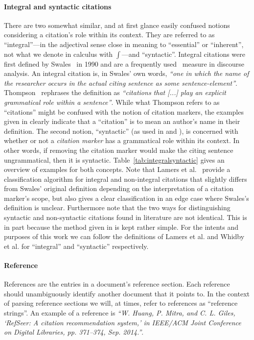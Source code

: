 \paragraph{Integral and syntactic citations} There are two somewhat similar, and at first glance easily confused notions considering a citation's role within its context. They are referred to as ``integral''---in the adjectival sense close in meaning to ``essential'' or ``inherent'', not what we denote in calculus with $\int$---and ``syntactic''. Integral citations were first defined by Swales~\cite{Swales1990} in 1990 and are a frequently used~\cite{Hyland1999,Thompson2001,Okamura2008,Lamers2018} measure in discourse analysis. An integral citation is, in Swales' own words, \emph{``one in which the name of the researcher occurs in the actual citing sentence as some sentence-element''}. Thompson~\cite{Thompson2001} rephrases the definition as \emph{``citations that [...] play an explicit grammatical role within a sentence''}. While what Thompson refers to as ``citations'' might be confused with the notion of citation markers, the examples given in \cite{Thompson2001} clearly indicate that a ``citation'' is to mean an author's name in their definition. The second notion, ``syntactic'' (as used in \cite{Whidby2011} and \cite{Abujbara2012}), is concerned with whether or not a \emph{citation marker} has a grammatical role within its context. In other words, if removing the citation marker would make the citing sentence ungrammatical, then it is syntactic. Table~\ref{tab:integralsyntactic} gives an overview of examples for both concepts. Note that Lamers et al.~\cite{Lamers2018} provide a classification algorithm for integral and non-integral citations that slightly differs from Swales' original definition depending on the interpretation of a citation marker's scope, but also gives a clear classification in an edge case where Swales's definition is unclear. Furthermore note that the two ways for distinguishing syntactic and non-syntactic citations found in literature are not identical. This is in part because the method given in \cite{Abujbara2012} is kept rather simple. For the intents and purposes of this work we can follow the definitions of Lamers et al. and Whidby et al. for ``integral'' and ``syntactic'' respectively.
\paragraph{Reference} References are the entries in a document's reference section. Each reference should unambiguously identify another document that it points to. In the context of parsing reference sections we will, at times, refer to references as ``reference strings''. An example of a reference is \emph{``W. Huang, P. Mitra, and C. L. Giles, `RefSeer: A citation recommendation system,' in IEEE/ACM Joint Conference on Digital Libraries, pp. 371–374, Sep. 2014.''}.
